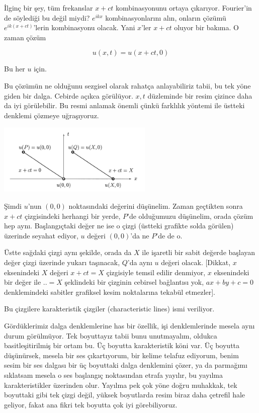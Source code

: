 \documentclass[12pt,fleqn]{article}\usepackage{../../common}
\begin{document}
İlginç bir şey, tüm frekanslar $x+ct$ kombinasyonunu ortaya
çıkarıyor. Fourier'in de söylediği bu değil miydi? $e^{ikx}$ kombinasyonlarını
alın, onların çözümü $e^{ik(x + ct)}$'lerin kombinasyonu olacak. Yani
$x$'ler $x+ct$ oluyor bir bakıma. O zaman çözüm

$$
u(x,t) = u(x+ct, 0)
$$

Bu her $u$ için.

Bu çözümün ne olduğunu sezgisel olarak rahatça anlayabiliriz tabii, bu
tek yöne giden bir dalga. Cebirde açıkca görülüyor. $x,t$ düzleminde
bir resim çizince daha da iyi görülebilir. Bu resmi anlamak önemli
çünkü farklılık yöntemi ile üstteki denklemi çözmeye uğraşıyoruz.

\includegraphics[width=20em]{compscieng_2_03_01.png}

Şimdi $u$'nun $(0,0)$ noktasındaki değerini düşünelim. Zaman geçtikten sonra
$x+ct$ çizgisindeki herhangi bir yerde, $P$'de olduğumuzu düşünelim, orada çözüm
hep aynı. Başlangıçtaki değer ne ise o çizgi (üstteki grafikte solda görülen)
üzerinde seyahat ediyor, $u$ değeri $(0,0)$'da ne $P$'de de o.

Üstte sağdaki çizgi aynı şekilde, orada da $X$ ile işaretli bir sabit değerde
başlayan değer çizgi üzerinde yukarı taşınacak, $Q$'da aynı $u$ değeri olacak.
[Dikkat, $x$ eksenindeki $X$ değeri $x+ct = X$ çizgisiyle temsil edilir
denmiyor, $x$ eksenindeki bir değer ile $.. =X$ şeklindeki bir çizginin
cebirsel bağlantısı yok, $ax+by+c=0$ denklemindeki sabitler grafiksel kesim
noktalarına tekabül etmezler].

Bu çizgilere karakteristik çizgiler (characteristic lines) ismi
veriliyor.

Gördüklerimiz dalga denklemlerine has bir özellik, işi denklemlerinde mesela
aynı durum görülmüyor. Tek boyuttayız tabii bunu unutmayalım, oldukca
basitleşitirilmiş bir ortam bu. Üç boyutta karakteristik köni var. Üç boyutta
düşünürsek, mesela bir ses çıkartıyorum, bir kelime telafuz ediyorum, benim
sesim bir ses dalgası bir üç boyuttaki dalga denklemini çözer, ya da parmağımı
sıklatsam mesela o ses başlangıç noktasından etrafa yayılır, bu yayılma
karakteristikler üzerinden olur. Yayılma pek çok yöne doğru muhakkak, tek
boyuttaki gibi tek çizgi değil, yüksek boyutlarda resim biraz daha çetrefil hale
geliyor, fakat ana fikri tek boyutta çok iyi görebiliyoruz.
\end{document}
